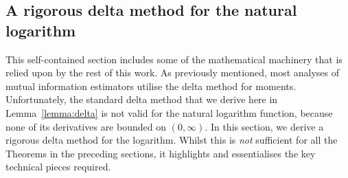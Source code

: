 \documentclass[a4paper, 10pt]{report}
\theoremstyle{plain}
\begin{document}
	\subsection{A rigorous delta method for the natural logarithm}
	\label{sec:rigorous}
	This self-contained section includes some of the mathematical machinery that is relied upon by the rest of this work.
	As previously mentioned, most analyses of mutual information estimators \citep{zheng2018robust,beck2018fast,rainforth2018nesting} utilise the delta method for moments.
	Unfortunately, the standard delta method that we derive here in Lemma~\ref{lemma:delta} is not valid for the natural logarithm function, because none of its derivatives are bounded on $(0,\infty)$.
	In this section, we derive a rigorous delta method for the logarithm.
	Whilst this is \emph{not} sufficient for all the Theorems in the preceding sections, it highlights and essentialises the key technical pieces required.
	
\end{document}
